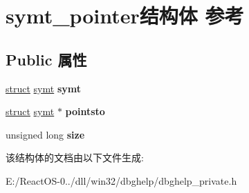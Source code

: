 \hypertarget{structsymt__pointer}{}\section{symt\+\_\+pointer结构体 参考}
\label{structsymt__pointer}
\subsection*{Public 属性}
\begin{DoxyCompactItemize}
\item 
\mbox{\label{structsymt__pointer_a69fd4a29116cba8ce8c0283796093d16}} 
\hyperlink{interfacestruct}{struct} \hyperlink{structsymt}{symt} {\bfseries symt}
\item 
\mbox{\label{structsymt__pointer_a158dfe173f15ed26ff110ebcef939007}} 
\hyperlink{interfacestruct}{struct} \hyperlink{structsymt}{symt} $\ast$ {\bfseries pointsto}
\item 
\mbox{\label{structsymt__pointer_a0cda41324431958f0156c3c65db1a66b}} 
unsigned long {\bfseries size}
\end{DoxyCompactItemize}


该结构体的文档由以下文件生成\+:\begin{DoxyCompactItemize}
\item 
E\+:/\+React\+O\+S-\/0../dll/win32/dbghelp/dbghelp\+\_\+private.\+h\end{DoxyCompactItemize}
